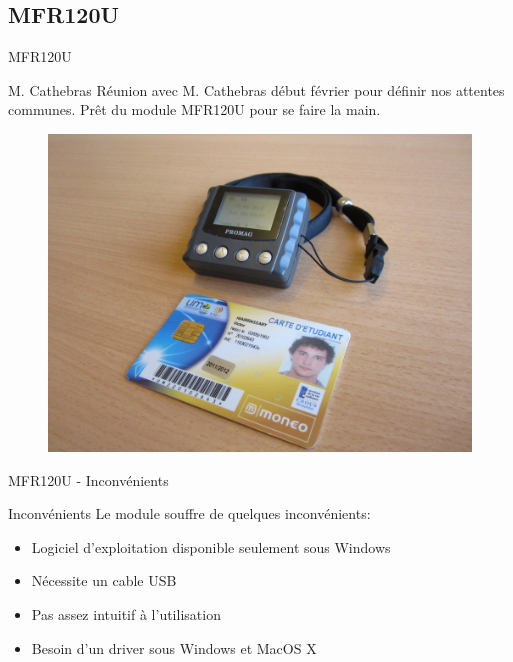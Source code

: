 \subsection{MFR120U}
\begin{frame}{MFR120U}
	\begin{block}{M. Cathebras}
        Réunion avec M. Cathebras début février pour définir nos attentes communes.
        Prêt du module MFR120U pour se faire la main.
	\end{block}

    \begin{figure}[h]
        \begin{center}
            \includegraphics[scale=0.4]{images/mfr.jpg} 
        \end{center}
     \end{figure} 
\end{frame}


\begin{frame}{MFR120U - Inconvénients}
	\begin{block}{Inconvénients}
        Le module souffre de quelques inconvénients:

	    \begin{itemize}
            \item Logiciel d'exploitation disponible seulement sous Windows
            \item Nécessite un cable USB
            \item Pas assez intuitif à l'utilisation
            \item Besoin d'un driver sous Windows et MacOS X
	    \end{itemize}
	\end{block}
\end{frame}


